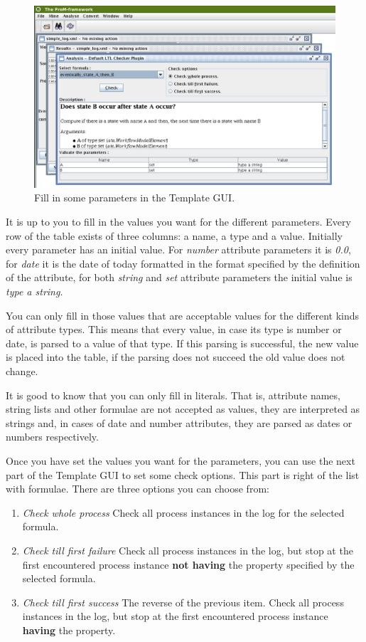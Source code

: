 \begin{figure}[H]
    \includegraphics[scale=0.4]{images/ltlchecker-valuate-params-cutted.eps}
    \caption{Fill in some parameters in the Template GUI.}
    \label{plugingui:valuateparameters}
\end{figure}

It is up to you to fill in the values you want for the different parameters.
Every row of the table exists of three columns: a name, a type and a value.
Initially every parameter has an initial value. For \textit{number} attribute parameters
it is \textit{0.0}, for \textit{date} it is the date of today formatted in the format
specified by the definition of the attribute, for both \textit{string} and
\textit{set} attribute parameters the initial value is \textit{type a string}.

You can only fill in those values that are acceptable values for the different
kinds of attribute types. This means that every value, in case its type is
number or date, is parsed to a value of that type. If this parsing is
successful, the new value is placed into the table, if the parsing does not
succeed the old value does not change.

It is good to know that you can only fill in literals. That is, attribute
names, string lists and other formulae are not accepted as values, they are
interpreted as strings and, in cases of date and number attributes, they are
parsed as dates or numbers respectively.

Once you have set the values you want for the parameters, you can use the next
part of the Template GUI to set some check options. This part is right of the
list with formulae. There are three options
you can choose from:
\begin{enumerate}
    \item \textit{Check whole process} Check all process instances in the log
    for the selected formula.
    \item \textit{Check till first failure} Check all process instances in the
    log, but stop at the first encountered process instance \textbf{not
    having} the property specified by the selected formula.
    \item \textit{Check till first success} The reverse of the previous item.
    Check all process instances in the log, but stop at the first encountered
    process instance \textbf{having} the property.
\end{enumerate}

